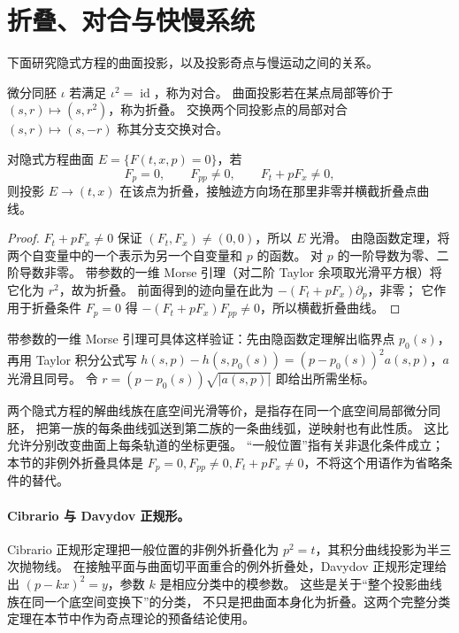 \section{折叠、对合与快慢系统}
下面研究隐式方程的曲面投影，以及投影奇点与慢运动之间的关系。
\begin{definition}
微分同胚 $\iota$ 若满足 $\iota^2=\operatorname{id}$，称为对合。
曲面投影若在某点局部等价于 $(s,r)\mapsto(s,r^2)$，称为折叠。
交换两个同投影点的局部对合 $(s,r)\mapsto(s,-r)$ 称其分支交换对合。
\end{definition}
\begin{proposition}
对隐式方程曲面 $E=\{F(t,x,p)=0\}$，若
\[
 F_p=0,\qquad F_{pp}\ne0,\qquad F_t+pF_x\ne0,
\]
则投影 $E\to(t,x)$ 在该点为折叠，接触迹方向场在那里非零并横截折叠点曲线。
\end{proposition}
\begin{proof}
$F_t+pF_x\ne0$ 保证 $(F_t,F_x)\ne(0,0)$，所以 $E$ 光滑。
由隐函数定理，将两个自变量中的一个表示为另一个自变量和 $p$ 的函数。
对 $p$ 的一阶导数为零、二阶导数非零。
带参数的一维 Morse 引理（对二阶 Taylor 余项取光滑平方根）将它化为 $r^2$，故为折叠。
前面得到的迹向量在此为 $-(F_t+pF_x)\partial_p$，非零；
它作用于折叠条件 $F_p=0$ 得
$-(F_t+pF_x)F_{pp}\ne0$，所以横截折叠曲线。
\end{proof}
带参数的一维 Morse 引理可具体这样验证：先由隐函数定理解出临界点 $p_0(s)$，
再用 Taylor 积分公式写
$h(s,p)-h(s,p_0(s))=(p-p_0(s))^2a(s,p)$，$a$ 光滑且同号。
令 $r=(p-p_0(s))\sqrt{|a(s,p)|}$ 即给出所需坐标。


\begin{definition}[投影曲线族的等价与一般位置]
两个隐式方程的解曲线族在底空间光滑等价，是指存在同一个底空间局部微分同胚，
把第一族的每条曲线弧送到第二族的一条曲线弧，逆映射也有此性质。
这比允许分别改变曲面上每条轨道的坐标更强。
“一般位置”指有关非退化条件成立；本节的非例外折叠具体是
$F_p=0,F_{pp}\ne0,F_t+pF_x\ne0$，不将这个用语作为省略条件的替代。
\end{definition}

\paragraph{Cibrario 与 Davydov 正规形。}
Cibrario 正规形定理把一般位置的非例外折叠化为 $p^2=t$，其积分曲线投影为半三次抛物线。
在接触平面与曲面切平面重合的例外折叠处，Davydov 正规形定理给出
$ (p-kx)^2=y$，参数 $k$ 是相应分类中的模参数。
这些是关于“整个投影曲线族在同一个底空间变换下”的分类，
不只是把曲面本身化为折叠。这两个完整分类定理在本节中作为奇点理论的预备结论使用。

